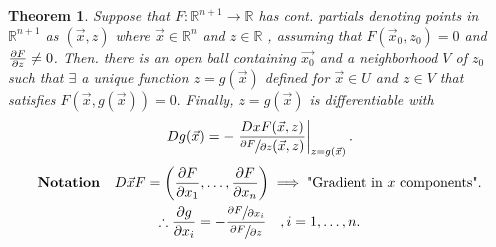 \documentclass[
	12pt,
	]{article}
\newcommand{\Rn}{\mathbb{R}^{n}}
\newcommand{\R}{\mathbb{R}}
\theoremstyle{custom}
\newtheorem{theorem}{Theorem}[section]
\theoremstyle{custom}
\theoremstyle{custom}
\theoremstyle{custom}
\theoremstyle{custom}
\theoremstyle{definition}
\theoremstyle{example}
\theoremstyle{note}
\theoremstyle{remark}
\theoremstyle{example}
\newcounter{theo}[section]\setcounter{theo}{0}
\numberwithin{equation}{subsection}
\begin{document}
	   		 \begin{theorem}
	   		 	Suppose that $F: \R^{n+1} \to \R$ has cont. partials denoting points in $\R^{n+1}$ as $(\vec{x},z)$ where $\vec{x} \in \Rn$ and $z \in \R$ , assuming that $F(\vec{x}_{0}, z_{0}) = 0 $ and $\pdv{F}{z} (\vec{x_{0}, z_{0}}) \neq 0$. Then. there is an open ball containing $\vec{x_{0}}$ and a neighborhood $V$ of $z_{0}$ such that $\exists$ a unique function $z=g(\vec{x})$ defined for $\vec{x} \in U$ and $z\in V$ that satisfies $F(\vec{x} , g(\vec{x})) =0. $
	   		 	Finally, $z=g(\vec{x})$ is differentiable with 
	   		 	\begin{equation}
	   		 	 D{g}(\vec{x}) = - \eval{\frac{D{x}F(\vec{x},z)}{\sfrac{\partial F}{\partial z} (\vec{x},z)}}_{z=g(\vec{x})}. 
	   		 	\end{equation}
				\begin{gather}	   		 	
	   		 	 \textbf{Notation } \ \ D{\vec{x}}F = \left(\pdv{F}{x_{1}} , \dots , \pdv{F}{x_{n}}\right) \implies \text{"Gradient in $x$ components".} \nonumber \\
	   		 	 \therefore \pdv{g}{x_{i}} = - \frac{\sfrac{\partial F}{\partial x_{i}}}{\sfrac{\partial F}{\partial z}} \quad , i = 1 , \dots , n .
	   		 	\end{gather}
	   		 \end{theorem}
	   		 
\end{document}
